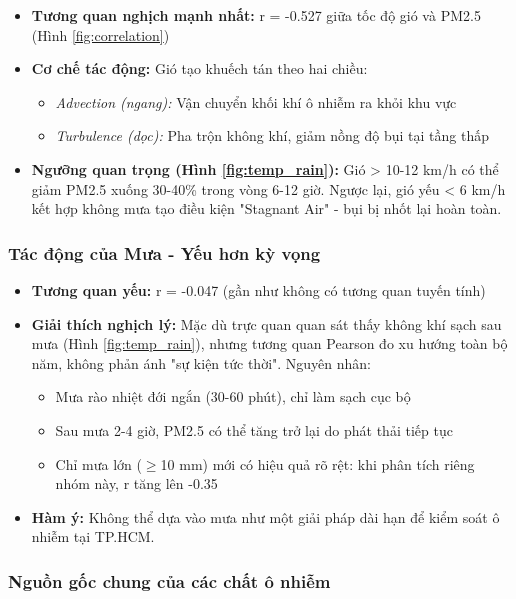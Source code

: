 \documentclass[12pt,a4paper]{article}
\begin{document}
\begin{itemize}
    \item \textbf{Tương quan nghịch mạnh nhất:} r = -0.527 giữa tốc độ gió và PM2.5 (Hình \ref{fig:correlation})
    \item \textbf{Cơ chế tác động:} Gió tạo khuếch tán theo hai chiều:
    \begin{itemize}
        \item \textit{Advection (ngang):} Vận chuyển khối khí ô nhiễm ra khỏi khu vực
        \item \textit{Turbulence (dọc):} Pha trộn không khí, giảm nồng độ bụi tại tầng thấp
    \end{itemize}
    \item \textbf{Ngưỡng quan trọng (Hình \ref{fig:temp_rain}):} Gió > 10-12 km/h có thể giảm PM2.5 xuống 30-40\% trong vòng 6-12 giờ. Ngược lại, gió yếu < 6 km/h kết hợp không mưa tạo điều kiện "Stagnant Air" - bụi bị nhốt lại hoàn toàn.
\end{itemize}

\subsubsection{Tác động của Mưa - Yếu hơn kỳ vọng}

\begin{itemize}
    \item \textbf{Tương quan yếu:} r = -0.047 (gần như không có tương quan tuyến tính)
    \item \textbf{Giải thích nghịch lý:} Mặc dù trực quan quan sát thấy không khí sạch sau mưa (Hình \ref{fig:temp_rain}), nhưng tương quan Pearson đo xu hướng toàn bộ năm, không phản ánh "sự kiện tức thời". Nguyên nhân:
    \begin{itemize}
        \item Mưa rào nhiệt đới ngắn (30-60 phút), chỉ làm sạch cục bộ
        \item Sau mưa 2-4 giờ, PM2.5 có thể tăng trở lại do phát thải tiếp tục
        \item Chỉ mưa lớn ($\geq$10 mm) mới có hiệu quả rõ rệt: khi phân tích riêng nhóm này, r tăng lên -0.35
    \end{itemize}
    \item \textbf{Hàm ý:} Không thể dựa vào mưa như một giải pháp dài hạn để kiểm soát ô nhiễm tại TP.HCM.
\end{itemize}

\subsubsection{Nguồn gốc chung của các chất ô nhiễm}
\end{document}
